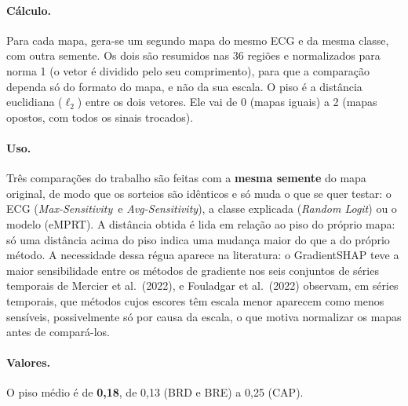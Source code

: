 \documentclass[11pt,a4paper]{article}
\newcommand{\MS}{\textit{Max-Sensitivity}}
\newcommand{\AS}{\textit{Avg-Sensitivity}}
\newcommand{\RL}{\textit{Random Logit}}
\newcommand{\EM}{eMPRT}
\begin{document}
\paragraph{Cálculo.} Para cada mapa, gera-se um segundo mapa do mesmo ECG e da mesma classe, com outra semente. Os dois são resumidos nas 36 regiões e normalizados para norma 1 (o vetor é dividido pelo seu comprimento), para que a comparação dependa só do formato do mapa, e não da sua escala. O piso é a distância euclidiana ($\ell_2$) entre os dois vetores. Ele vai de 0 (mapas iguais) a 2 (mapas opostos, com todos os sinais trocados).

\paragraph{Uso.} Três comparações do trabalho são feitas com a \textbf{mesma semente} do mapa original, de modo que os sorteios são idênticos e só muda o que se quer testar: o ECG (\MS\ e \AS), a classe explicada (\RL) ou o modelo (\EM). A distância obtida é lida em relação ao piso do próprio mapa: só uma distância acima do piso indica uma mudança maior do que a do próprio método. A necessidade dessa régua aparece na literatura: o GradientSHAP teve a maior sensibilidade entre os métodos de gradiente nos seis conjuntos de séries temporais de Mercier et al.\ (2022), e Fouladgar et al.\ (2022) observam, em séries temporais, que métodos cujos escores têm escala menor aparecem como menos sensíveis, possivelmente só por causa da escala, o que motiva normalizar os mapas antes de compará-los.

\paragraph{Valores.} O piso médio é de \textbf{0,18}, de 0,13 (BRD e BRE) a 0,25 (CAP).
\end{document}
